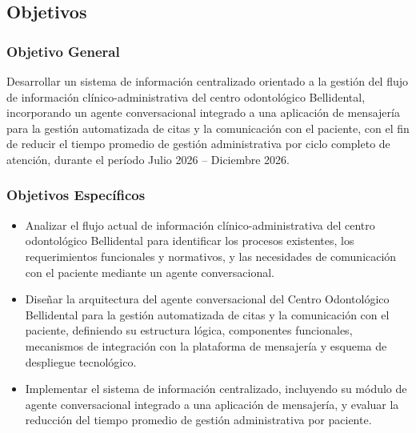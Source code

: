 \subsection{Objetivos}

\subsubsection{Objetivo General}

Desarrollar un sistema de información centralizado orientado a la gestión del flujo de información clínico-administrativa del centro odontológico Bellidental, incorporando un agente conversacional integrado a una aplicación de mensajería para la gestión automatizada de citas y la comunicación con el paciente, con el fin de reducir el tiempo promedio de gestión administrativa por ciclo completo de atención, durante el período Julio 2026 -- Diciembre 2026.

\subsubsection{Objetivos Específicos}

\begin{itemize}
    \item Analizar el flujo actual de información clínico-administrativa del centro odontológico Bellidental para identificar los procesos existentes, los requerimientos funcionales y normativos, y las necesidades de comunicación con el paciente mediante un agente conversacional.
    \item Diseñar la arquitectura del agente conversacional del Centro Odontológico Bellidental para la gestión automatizada de citas y la comunicación con el paciente, definiendo su estructura lógica, componentes funcionales, mecanismos de integración con la plataforma de mensajería y esquema de despliegue tecnológico.
    \item Implementar el sistema de información centralizado, incluyendo su módulo de agente conversacional integrado a una aplicación de mensajería, y evaluar la reducción del tiempo promedio de gestión administrativa por paciente.
\end{itemize}



